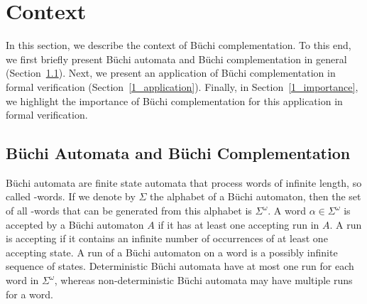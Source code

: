 



\section{Context}
\label{1_context}
In this section, we describe the context of Büchi complementation. To this end, we first briefly present Büchi automata and Büchi complementation in general (Section~\ref{1_buchi_automata}). Next, we present an application of Büchi complementation in formal verification (Section~\ref{1_application}). Finally, in Section~\ref{1_importance}, we highlight the importance of Büchi complementation for this application in formal verification.

\subsection{Büchi Automata and Büchi Complementation}
\label{1_buchi_automata}
Büchi automata are finite state automata that process words of infinite length, so called \om-words. If we denote by $\Sigma$ the alphabet of a Büchi automaton, then the set of all \om-words that can be generated from this alphabet is $\Sigma^\omega$. A word $\alpha \in \Sigma^\omega$ is accepted by a Büchi automaton $A$ if it has at least one accepting run in $A$. A run is accepting if it contains an infinite number of occurrences of at least one accepting state. A run of a Büchi automaton on a word is a possibly infinite sequence of states. Deterministic Büchi automata have at most one run for each word in $\Sigma^\omega$, whereas non-deterministic Büchi automata may have multiple runs for a word.

